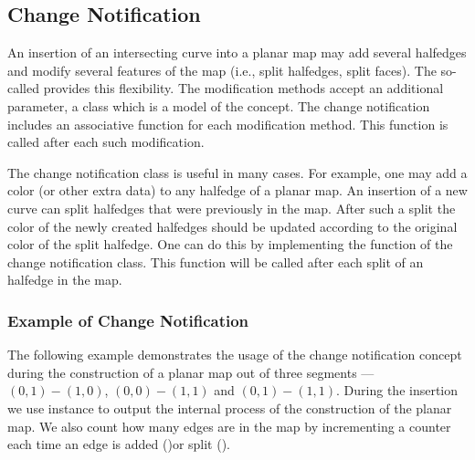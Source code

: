 

\begin{ccAdvanced}
\subsection*{Change Notification}
  An insertion of an intersecting curve into a planar map may add
  several halfedges and modify several features of the map (i.e.,
  split halfedges, split faces). The so-called  provides this flexibility. The modification methods
  accept an additional parameter, a class which is a model of the
   concept. The
  change notification includes an associative function for each
  modification method.  This function is called after each such
  modification.

  The change notification class is useful in many cases. For example,
  one may add a color (or other extra data) to any halfedge of a
  planar map. An insertion of a new curve can split halfedges that
  were previously in the map. After such a split the color of the
  newly created halfedges should be updated according to the original
  color of the split halfedge. One can do this by implementing the
   function of the change notification class. This
  function will be called after each split of an halfedge in the map.

\subsubsection{Example of Change Notification}
\label{ssecn:example2}
The following example demonstrates the usage of the change
notification concept during the construction of a
planar map out of three segments --- $(0,1)-(1,0)$, $(0,0)-(1,1)$
and $(0,1)-(1,1)$.
During the insertion we use  instance to
output the internal process of the construction of the planar map.
We also count how many edges are in the map by incrementing a
counter each time an edge is added ()or
split ().


\end{ccAdvanced}
